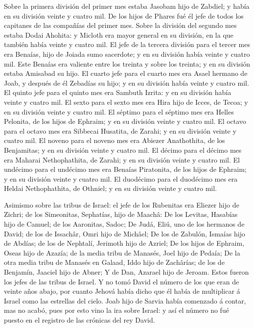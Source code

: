  Sobre la primera división del primer mes estaba Jasobam
hijo de Zabdiel; y había en su división veinte y cuatro mil.
 De los hijos de Phares fué él jefe de todos los capitanes
de las compañías del primer mes.  Sobre la división del
segundo mes estaba Dodai Ahohita: y Micloth era mayor general en su
división, en la que también había veinte y cuatro mil.  El
jefe de la tercera división para el tercer mes era Benaías, hijo de
Joiada sumo sacerdote; y en su división había veinte y cuatro mil.
 Este Benaías era valiente entre los treinta y sobre los
treinta; y en su división estaba Amisabad su hijo.  El
cuarto jefe para el cuarto mes era Asael hermano de Joab, y después de
él Zebadías su hijo; y en su división había veinte y cuatro mil.
 El quinto jefe para el quinto mes era Sambuth Izrita: y en
su división había veinte y cuatro mil.  El sexto para el
sexto mes era Hira hijo de Icces, de Tecoa; y en su división veinte y
cuatro mil.  El séptimo para el séptimo mes era Helles
Pelonita, de los hijos de Ephraim; y en su división veinte y cuatro mil.
 El octavo para el octavo mes era Sibbecai Husatita, de
Zarahi; y en su división veinte y cuatro mil.  El noveno
para el noveno mes era Abiezer Anathothita, de los Benjamitas; y en su
división veinte y cuatro mil.  El décimo para el décimo mes
era Maharai Nethophathita, de Zarahi; y en su división veinte y cuatro
mil.  El undécimo para el undécimo mes era Benaías
Piratonita, de los hijos de Ephraim; y en su división veinte y cuatro
mil.  El duodécimo para el duodécimo mes era Heldai
Nethophathita, de Othniel; y en su división veinte y cuatro mil.

 Asimismo sobre las tribus de Israel: el jefe de los
Rubenitas era Eliezer hijo de Zichri; de los Simeonitas, Sephatías, hijo
de Maachâ:  De los Levitas, Hasabías hijo de Camuel; de los
Aaronitas, Sadoc;  De Judá, Eliú, uno de los hermanos de
David; de los de Issachâr, Omri hijo de Michâel;  De los de
Zabulón, Ismaías hijo de Abdías; de los de Nephtalí, Jerimoth hijo de
Azriel;  De los hijos de Ephraim, Oseas hijo de Azazía; de
la media tribu de Manasés, Joel hijo de Pedaía;  De la otra
media tribu de Manasés en Galaad, Iddo hijo de Zachârías; de los de
Benjamín, Jaaciel hijo de Abner;  Y de Dan, Azarael hijo de
Jeroam. Estos fueron los jefes de las tribus de Israel.  Y
no tomó David el número de los que eran de veinte años abajo, por cuanto
Jehová había dicho que él había de multiplicar á Israel como las
estrellas del cielo.  Joab hijo de Sarvia había comenzado á
contar, mas no acabó, pues por esto vino la ira sobre Israel: y así el
número no fué puesto en el registro de las crónicas del rey David.

